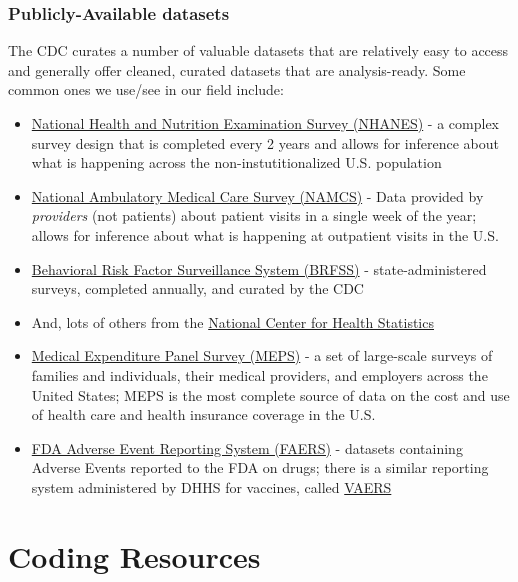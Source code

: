 \documentclass[
  letterpaper,
  DIV=11,
  numbers=noendperiod]{scrreprt}
\begin{document}
\hypertarget{publicly-available-datasets}{%
\subsection{Publicly-Available
datasets}\label{publicly-available-datasets}}

The CDC curates a number of valuable datasets that are relatively easy
to access and generally offer cleaned, curated datasets that are
analysis-ready. Some common ones we use/see in our field include:

\begin{itemize}
\item
  \href{https://www.cdc.gov/nchs/nhanes/index.htm}{National Health and
  Nutrition Examination Survey (NHANES)} - a complex survey design that
  is completed every 2 years and allows for inference about what is
  happening across the non-instutitionalized U.S. population
\item
  \href{https://www.cdc.gov/nchs/ahcd/index.htm}{National Ambulatory
  Medical Care Survey (NAMCS)} - Data provided by \emph{providers} (not
  patients) about patient visits in a single week of the year; allows
  for inference about what is happening at outpatient visits in the U.S.
\item
  \href{https://www.cdc.gov/brfss/index.html}{Behavioral Risk Factor
  Surveillance System (BRFSS)} - state-administered surveys, completed
  annually, and curated by the CDC
\item
  And, lots of others from the
  \href{https://www.cdc.gov/nchs/index.htm}{National Center for Health
  Statistics}
\item
  \href{https://www.meps.ahrq.gov/mepsweb/}{Medical Expenditure Panel
  Survey (MEPS)} - a set of large-scale surveys of families and
  individuals, their medical providers, and employers across the United
  States; MEPS is the most complete source of data on the cost and use
  of health care and health insurance coverage in the U.S.
\item
  \href{https://www.fda.gov/drugs/surveillance/questions-and-answers-fdas-adverse-event-reporting-system-faers}{FDA
  Adverse Event Reporting System (FAERS)} - datasets containing Adverse
  Events reported to the FDA on drugs; there is a similar reporting
  system administered by DHHS for vaccines, called
  \href{https://vaers.hhs.gov/}{VAERS}
\end{itemize}


\hypertarget{sec-coding}{%
\chapter{Coding Resources}\label{sec-coding}}
\end{document}
